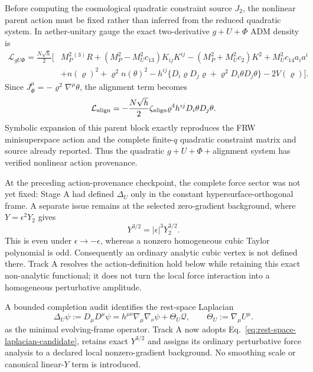 Before computing the cosmological quadratic constraint source $J_2$, the
nonlinear parent action must be fixed rather than inferred from the reduced
quadratic system.  In aether-unitary gauge the exact two-derivative
$g+U+\Phi$ ADM density is
\begin{align}
 \mathcal L_{gU\Phi}=\frac{N\sqrt h}{2}\big[&
 M_P^2{}^{(3)}R+(M_P^2-M_U^2c_{13})K_{ij}K^{ij}
 -(M_P^2+M_U^2c_2)K^2+M_U^2c_{14}a_i a^i\nonumber\\
 &+n(\varrho)^2+\varrho^2n(\theta)^2
 -h^{ij}\{D_i\varrho D_j\varrho
 +\varrho^2D_i\theta D_j\theta\}-2V(\varrho)\big].
 \label{eq:nonlinear-adm-parent}
\end{align}
Since $J_\Phi^\mu=-\varrho^2\nabla^\mu\theta$, the alignment term becomes
\begin{equation}
 \mathcal L_{\rm align}=-\frac{N\sqrt h}{2}\zeta_{\rm align}
 \varrho^4h^{ij}D_i\theta D_j\theta .
 \label{eq:nonlinear-adm-alignment}
\end{equation}
Symbolic expansion of this parent block exactly reproduces the FRW
minisuperspace action and the complete finite-$q$ quadratic constraint matrix
and source already reported.  Thus the quadratic $g+U+\Phi+$alignment system
has verified nonlinear action provenance.

At the preceding action-provenance checkpoint, the complete force sector was
not yet fixed: Stage A had defined $\Delta_U$ only in the constant
hypersurface-orthogonal frame.  A separate issue remains at the selected
zero-gradient background, where $Y=\epsilon^2Y_2$ gives
\begin{equation}
 Y^{3/2}=|\epsilon|^3Y_2^{3/2}.
 \label{eq:force-nonanalytic-origin}
\end{equation}
This is even under $\epsilon\to-\epsilon$, whereas a nonzero homogeneous cubic
Taylor polynomial is odd.  Consequently an ordinary analytic cubic vertex is
not defined there.  Track A resolves the action-definition hold below while
retaining this exact non-analytic functional; it does not turn the local force
interaction into a homogeneous perturbative amplitude.

A bounded completion audit identifies the rest-space Laplacian
\begin{equation}
 \Delta_U\psi:=D_\mu D^\mu\psi
 =h^{\mu\nu}\nabla_\mu\nabla_\nu\psi+\Theta_U\mathcal Q,
 \qquad \Theta_U:=\nabla_\mu U^\mu .
 \label{eq:rest-space-laplacian-candidate}
\end{equation}
as the minimal evolving-frame operator.  Track A now adopts
Eq.~\eqref{eq:rest-space-laplacian-candidate}, retains exact $Y^{3/2}$ and
assigns its ordinary perturbative force analysis to a declared local
nonzero-gradient background.  No smoothing scale or canonical linear-$Y$ term
is introduced.

